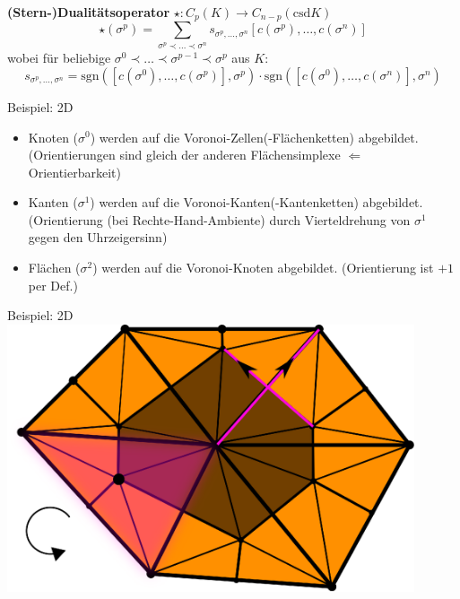 \documentclass[handout]{beamer}
\begin{document}
  \begin{frame}
    \begin{block}{\textbf{(Stern-)Dualitätsoperator} \( \star: C_{p}(K) \longrightarrow C_{n-p}(\text{csd}K) \)}
      \[ \star(\sigma^{p}) = \sum_{\sigma^{p} \prec \ldots \prec \sigma^{n}} s_{\sigma^{p},\ldots,\sigma^{n}} \left[ c(\sigma^{p}),\ldots,c(\sigma^{n}) \right]  \]
      wobei für beliebige \( \sigma^{0} \prec \ldots \prec \sigma^{p-1} \prec \sigma^{p} \) aus \( K \):
      \[ s_{\sigma^{p},\ldots,\sigma^{n}} = \text{sgn}\left( \left[ c(\sigma^{0}),\ldots,c(\sigma^{p}) \right], \sigma^{p} \right) 
                                      \cdot \text{sgn}\left( \left[ c(\sigma^{0}),\ldots,c(\sigma^{n}) \right], \sigma^{n} \right) \]
    \end{block}
    \pause
    \begin{block}{Beispiel: 2D}
      \begin{itemize}
        \item<2-> Knoten (\( \sigma^{0} \)) werden auf die  Voronoi-\glqq Zellen\grqq (-Flächenketten) abgebildet.
          (Orientierungen sind gleich der anderen Flächensimplexe \(\Leftarrow\) Orientierbarkeit) 
        \item<3-> Kanten (\( \sigma^{1} \)) werden auf die Voronoi-\glqq Kanten\grqq (-Kantenketten) abgebildet.
          (Orientierung (bei Rechte-Hand-Ambiente) durch Vierteldrehung von \( \sigma^{1} \) gegen den Uhrzeigersinn)
        \item<4-> Flächen (\( \sigma^{2} \)) werden auf die Voronoi-Knoten abgebildet. (Orientierung ist \( +1 \) per Def.)
      \end{itemize}
    \end{block}
  \end{frame}
    
  \begin{frame}
    \begin{block}{Beispiel: 2D}
      \centering\includegraphics[width=0.9\textwidth]{bilder/inkscape/dualSigma0.eps}
    \end{block}
  \end{frame}
\end{document}
